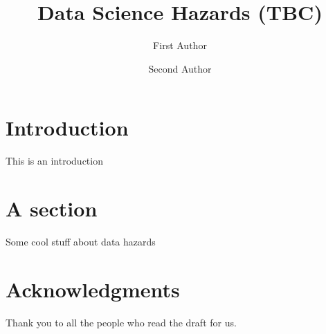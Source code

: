 \documentclass[fleqn,10pt]{olplainarticle}
\title{Data Science Hazards (TBC)}
\author[1]{First Author}
\author[2]{Second Author}
\affil[1]{Address of first author}
\affil[2]{Address of second author}
\begin{document}
\flushbottom
\maketitle
\thispagestyle{empty}

\section*{Introduction}

This is an introduction


\section*{A section}

Some cool stuff about data hazards

\section*{Acknowledgments}

Thank you to all the people who read the draft for us. 

\printbibliography
\end{document}
